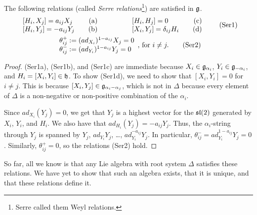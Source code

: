  \begin{claim}
   The following relations (called \emph{Serre relations}\footnote{Serre called them Weyl relations.}) are satisfied
   in $\g$. \hypertarget{Serre}
   {\begin{gather*}
     \begin{array}{lr}
       [H_i, X_j]=a_{ij} X_j & \text{\normalfont \quad(a)} \\
       {[H_i,Y_j]=-a_{ij}Y_j} & \text{\normalfont \quad(b)}
     \end{array}\qquad\qquad
     \begin{array}{lr}
       {[H_i, H_j] = 0} & \text{\normalfont \quad(c)}\\
       {[X_i,Y_j]=\delta_{ij}H_i} & \text{\normalfont \quad(d)}
     \end{array} \tag{Ser1}\\
     \begin{array}{l}
       \theta_{ij}^+ := (ad_{X_i})^{1-a_{ij}}X_j = 0 \\
       \theta_{ij}^- := (ad_{Y_i})^{1-a_{ij}}Y_j = 0
     \end{array}\text{, for }i\neq j. \tag{Ser2}
   \end{gather*}}
 \end{claim}
 \begin{proof}
   (Ser1a), (Ser1b), and (Ser1c) are immediate because $X_i\in \g_{\alpha_i}$, $Y_i\in
   \g_{-\alpha_i}$, and $H_i=[X_i,Y_i]\in \h$. To show (Ser1d), we need to show that
   $[X_i,Y_i]=0$ for $i\neq j$. This is because $[X_i,Y_j]\in \g_{\alpha_i-\alpha_j}$,
   which is not in $\Delta$ because every element of $\Delta$ is a non-negative or
   non-positive combination of the $\alpha_i$.

   Since $ad_{X_i}(Y_j)=0$, we get that $Y_j$ is a highest vector for the $\sl(2)$
   generated by $X_i$, $Y_i$, and $H_i$. We also have that $ad_{H_i}(Y_j)=
   -a_{ij}Y_j$. Thus, the $\alpha_i$-string
   through $Y_j$ is spanned by $Y_j$, $ad_{Y_i}Y_j$, \dots, $ad_{Y_i}^{-a_{ij}}Y_j$.
   In particular, $\theta^-_{ij}=ad_{Y_i}^{1-a_{ij}} Y_j=0$. Similarly,
   $\theta^+_{ij}=0$, so the relations (Ser2) hold.
 \end{proof}
 So far, all we know is that any Lie algebra with root system $\Delta$ satisfies these
 relations. We have yet to show that such an algebra exists, that it is unique, and
 that these relations define it.

%

